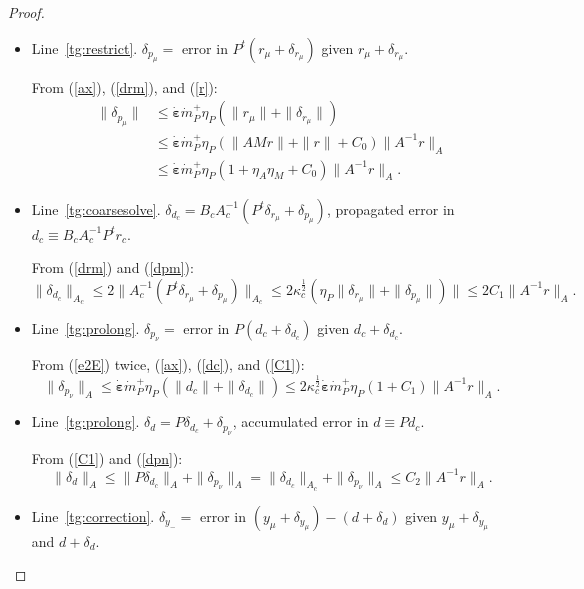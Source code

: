 \documentclass[onefignum,onetabnum]{siamart220329}
\newcommand{\ewed}{\boldsymbol{\dot{\varepsilon}}}
\newcommand{\alpdot}{{\dot{m}}_P^+}
\begin{document}
{\begin{proof}
\begin{itemize}
\item Line~\ref{tg:restrict}. $\delta_{p_\mu} =$ error in  $P^t(r_{\mu} + \delta_{r_{\mu}})$ given $r_{\mu} + \delta_{r_{\mu}}$.

From (\ref{ax}), (\ref{drm}), and (\ref{r}):
\begin{align}
\label{dpm}
\|\delta_{p_\mu}\| &\le \ewed \alpdot \eta_P (\|r_{\mu}\| + \|\delta_{r_{\mu}}\|) \\
&\le \ewed \alpdot \eta_P (\|AMr\| + \|r\| + C_0) \|A^{-1}r\|_A \nonumber \\
&\le \ewed \alpdot \eta_P (1 + \eta_A \eta_M + C_0) \|A^{-1}r\|_A \nonumber .
\end{align}

\item Line~\ref{tg:coarsesolve}. $\delta_{d_c} = B_c A_c^{-1} (P^t\delta_{r_\mu} + \delta_{p_\mu})$, propagated error in  $d_c \equiv B_c A_c^{-1} P^tr_c$. 

From (\ref{drm}) and (\ref{dpm}):
\begin{equation}
\|\delta_{d_c}\|_{A_c} \le 2 \|A_c^{-1}(P^t\delta_{r_\mu} + \delta_{p_\mu})\|_{A_c} \le 2 \kappa_c^\frac{1}{2} (\eta_P \|\delta_{r_\mu}\| + \|\delta_{p_\mu}\|)\| \le 2 C_1 \|A^{-1}r\|_A .
\label{C1}
\end{equation}

\item Line~\ref{tg:prolong}. $\delta_{p_\nu} =$ error in  $P(d_c + \delta_{d_c})$ given $d_c + \delta_{d_c}$.

From (\ref{e2E}) twice, (\ref{ax}), (\ref{dc}), and (\ref{C1}):
\begin{equation}
\|\delta_{p_\nu}\|_A \le \ewed \alpdot \eta_P (\|d_c\| + \|\delta_{d_c}\|)
\le 2 \kappa_c^\frac{1}{2} \ewed \alpdot \eta_P (1 + C_1) \|A^{-1}r\|_A .
\label{dpn}
\end{equation}

\item Line~\ref{tg:prolong}. $\delta_{d} = P\delta_{d_c} + \delta_{p_\nu}$, accumulated error in  $d \equiv Pd_c$.

From (\ref{C1}) and (\ref{dpn}):
\begin{equation}
\|\delta_{d}\|_A \le \|P\delta_{d_c}\|_A + \|\delta_{p_\nu}\|_A = \|\delta_{d_c}\|_{A_c} + \|\delta_{p_\nu}\|_A \le C_2 \|A^{-1}r\|_A .
\label{C2}
\end{equation}

\item Line~\ref{tg:correction}. $\delta_{y_-} =$ error in  $(y_\mu + \delta_{y_\mu}) - (d + \delta_{d})$ given $y_\mu + \delta_{y_\mu}$ and  $d + \delta_{d}$.


\end{itemize}
\end{proof}}
\end{document}

